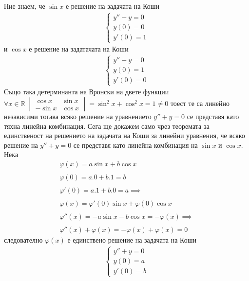 \documentclass[a4paper, 12pt, oneside]{article}
\newcommand{\R}{\mathbb{R}}
\begin{document}
Ние знаем, че $\sin x$ е решение на задачата на Коши
\begin{align*}
    \begin{cases}
        y'' + y = 0 \\
        y(0) = 0 \\
        y'(0) = 1
    \end{cases}
\end{align*}
и $\cos x$ е решение на задатачата на Коши
\begin{align*}
    \begin{cases}
        y'' + y = 0 \\
        y(0) = 1 \\
        y'(0) = 0
    \end{cases}
\end{align*}
Също така детерминанта на Вронски на двете функции \\
$\forall x \in \R \; \begin{vmatrix}
    \cos x & \sin x \\
    -\sin x & \cos x
\end{vmatrix} = \sin^2 x + \cos^2 x = 1 \neq 0$ тоест те са линейно независими
тогава всяко решение на уравнението $y'' + y = 0$ се представя като тяхна линейна
комбинация.  Сега ще докажем само чрез теоремата за единственост на решението
на задачата на Коши за линейни уравнения, че всяко решение на $y'' + y = 0$
се представя като линейна комбинация на $\sin x$ и $\cos x$.
Нека
\begin{align*}
    \varphi(x) = a\sin x + b \cos x \\\\
    \varphi(0) = a.0 + b.1 = b \\\\
    \varphi'(0) = a.1 + b.0 = a \implies \\\\
    \varphi(x) = \varphi'(0)\sin x + \varphi(0)\cos x \\\\
    \varphi''(x) = -a\sin x - b\cos x = -\varphi(x) \implies \\\\
    \varphi''(x) + \varphi(x) = -\varphi(x) + \varphi(x) = 0
\end{align*} следователно $\varphi(x)$ е единствено решение на задачата на Коши
\begin{align*}
    \begin{cases}
        y'' + y = 0 \\
        y(0) = a \\
        y'(0) = b
    \end{cases}
\end{align*}
\end{document}
